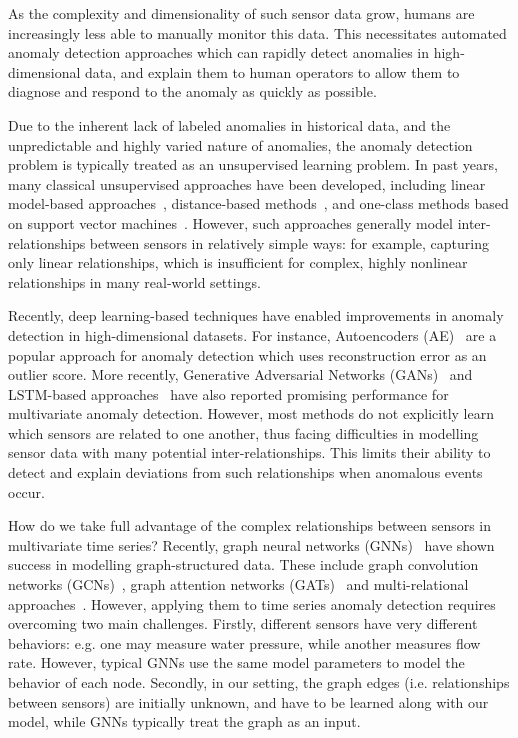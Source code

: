 \documentclass[letterpaper]{article} %
\begin{document}
As the complexity and dimensionality of such sensor data grow, humans are increasingly less able to manually monitor this data. This necessitates automated anomaly detection approaches which can rapidly detect anomalies in high-dimensional data, and explain them to human operators to allow them to diagnose and respond to the anomaly as quickly as possible.

Due to the inherent lack of labeled anomalies in historical data, and the unpredictable and highly varied nature of anomalies, the anomaly detection problem is typically treated as an unsupervised learning problem. In past years, many classical unsupervised approaches have been developed, including linear model-based approaches~\cite{pca}, distance-based methods~\cite{knn}, and one-class methods based on support vector machines~\cite{oneclasssvm}. However, such approaches generally model inter-relationships between sensors in relatively simple ways: for example, capturing only linear relationships, which is insufficient for complex, highly nonlinear relationships in many real-world settings. 

Recently, deep learning-based techniques have enabled improvements in anomaly detection in high-dimensional datasets. For instance, Autoencoders (AE)~\cite{autoencoding} are a popular approach for anomaly detection which uses reconstruction error as an outlier score. More recently, Generative Adversarial Networks (GANs)~\cite{li2019mad} and LSTM-based approaches~\cite{lstmencoder} have also reported promising performance for multivariate anomaly detection. However, most methods do not explicitly learn which sensors are related to one another, thus facing difficulties in modelling sensor data with many potential inter-relationships. This limits their ability to detect and explain deviations from such relationships when anomalous events occur.

How do we take full advantage of the complex relationships between sensors in multivariate time series? Recently, graph neural networks (GNNs)~\cite{gcnn} have shown success in modelling graph-structured data. These include graph convolution networks (GCNs)~\cite{gcn}, graph attention networks (GATs)~\cite{gat} and multi-relational approaches~\cite{relationalgcn}. However, applying them to time series anomaly detection requires overcoming two main challenges. Firstly, different sensors have very different behaviors: e.g. one may measure water pressure, while another measures flow rate. However, typical GNNs use the same model parameters to model the behavior of each node. Secondly, in our setting, the graph edges (i.e. relationships between sensors) are initially unknown, and have to be learned along with our model, while GNNs typically treat the graph as an input.
\end{document}
